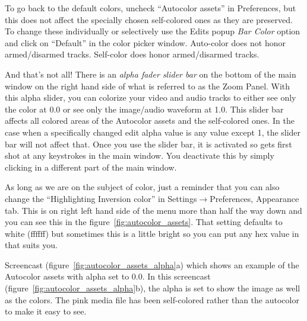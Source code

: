 To go back to the default colors, uncheck “Autocolor assets” in Preferences, but this does not affect the specially chosen self-colored ones as they are preserved.  
To change these individually or  selectively use the Edits popup \emph{Bar Color} option and click on “Default” in the color picker window.  Auto-color does not honor armed/disarmed tracks.  
Self-color does honor armed/disarmed tracks.

And that’s not all!  
There is an \emph{alpha fader slider bar} on the bottom of the main window on the right hand side of what is referred to as the Zoom Panel.  
With this alpha slider, you can colorize your video and audio tracks to either see only the color at 0.0 or see only the image/audio waveform at 1.0.  
This slider bar affects all colored areas of the Autocolor assets and the self-colored ones.  
In the case when a specifically changed edit alpha value is any value except 1, the slider bar will not affect that.  
Once you use the slider bar, it is activated so gets first shot at any keystrokes in the main window.  
You deactivate this by simply clicking in a different part of the main window.  

As long as we are on the subject of color, just a reminder that you can also change the “Highlighting Inversion color” in Settings$\rightarrow$Preferences, Appearance tab.  
This is on right left hand side of the menu more than half the way down and you can see this in the figure~\ref{fig:autocolor_assets}.  
That setting defaults to white (ffffff) but sometimes this is a little bright so you can put any hex value in that suits you.

Screencast (figure~\ref{fig:autocolor_assets_alpha}a) which shows an example of the Autocolor assets with alpha set to 0.0.
In this screencast (figure~\ref{fig:autocolor_assets_alpha}b), the alpha is set to show the image as well as the colors.  The pink media file has been self-colored rather than the autocolor to make it easy to see.

